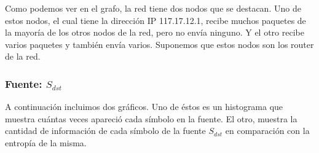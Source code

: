 \documentclass[10pt, a4paper]{article}
\begin{document}
Como podemos ver en el grafo, la red tiene dos nodos que se destacan. Uno de estos nodos, el cual tiene la dirección IP 117.17.12.1, recibe muchos paquetes de la mayoría de los otros nodos de la red, pero no envía ninguno. Y el otro recibe varios paquetes y también envía varios. Suponemos que estos nodos son los router de la red.

\subsubsection{Fuente: $S_{dst}$}

A continuación incluimos dos gráficos. Uno de éstos es un histograma que muestra cuántas veces apareció cada símbolo en la fuente. El otro, muestra la cantidad de información de cada símbolo de la fuente $S_{dst}$ en comparación con la entropía de la misma. 
\end{document}
